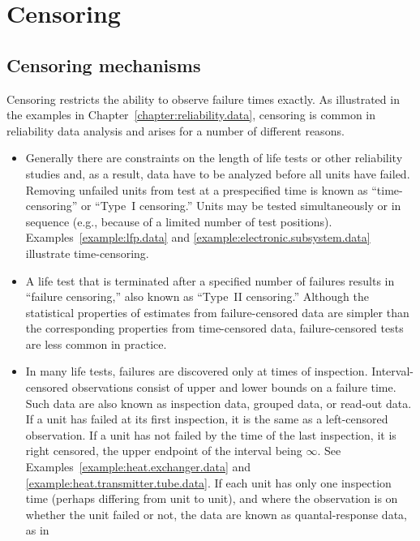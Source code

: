 \section{Censoring}
\subsection{Censoring mechanisms}
\label{section:censoring.mechanisms}
Censoring restricts the ability to observe failure times exactly.  As
illustrated in the examples in Chapter~\ref{chapter:reliability.data},
censoring is common in reliability data analysis and arises for a
number of different reasons.
\begin{itemize}
\item 
Generally there are constraints on the length of life tests or other
reliability studies and, as a result, data have to be analyzed before
all units have failed.  Removing unfailed units from test at a
prespecified time is known as ``time-censoring'' or ``Type~I
censoring.'' Units may be tested simultaneously or in sequence (e.g.,
because of a limited number of test positions).
Examples~\ref{example:lfp.data} and
\ref{example:electronic.subsystem.data} illustrate time-censoring.
\item 
A life test that is terminated after a specified number of failures
results in ``failure censoring,'' also known as ``Type~II
censoring.''  Although the statistical properties of estimates from
failure-censored data are simpler than the corresponding properties
from time-censored data, failure-censored tests are less common in
practice.
\item 
In many life tests, failures are discovered only at times of
inspection. Interval-censored observations consist of upper and
lower bounds on a failure time. Such data are also known as
inspection data, grouped data, or read-out data.  If a unit has
failed at its first inspection, it is the same as a left-censored
observation. If a unit has not failed by the time of the last
inspection, it is right censored, the upper endpoint of the
interval being $\infty$. See
Examples~\ref{example:heat.exchanger.data} and
\ref{example:heat.transmitter.tube.data}.
If each unit has only one inspection time (perhaps differing from
unit to unit), and where the observation is on whether the unit
failed or not, the data are known as quantal-response data, as in

\end{itemize}
